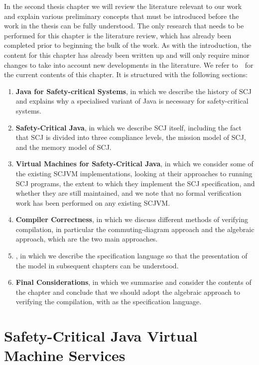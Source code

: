 \documentclass[a4paper,10pt]{report}
\let\olditem\item
\renewcommand{\item}[1][]{\olditem{\bfseries #1}}
\begin{document}
In the second thesis chapter we will review the literature relevant to
our work and explain various preliminary concepts that must be
introduced before the work in the thesis can be fully understood.
The only research that needs to be performed for this chapter is the
literature review, which has already been completed prior to beginning
the bulk of the work.
As with the introduction, the content for this chapter has already
been written up and will only require minor changes to take into
account new developments in the literature.
We refer to~\cite{baxter2016}~for the current contents of this
chapter.
It is structured with the following sections:
\begin{enumerate}
\item[Java for Safety-critical Systems], in which we describe the
  history of SCJ and explains why a specialised variant of Java is
  necessary for safety-critical systems.
\item[Safety-Critical Java], in which we describe SCJ itself, including the
  fact that SCJ is divided into three compliance levels, the mission
  model of SCJ, and the memory model of SCJ.
\item[Virtual Machines for Safety-Critical Java], in which we consider
  some of the existing SCJVM implementations, looking at their
  approaches to running SCJ programs, the extent to which they
  implement the SCJ specification, and whether they are still
  maintained, and we note that no formal verification work has
  been performed on any existing SCJVM.
\item[Compiler Correctness], in which we discuss different methods of
  verifying compilation, in particular the commuting-diagram approach
  and the algebraic approach, which are the two main approaches.
\item[\Circus{}], in which we describe the \Circus{} specification
  language so that the presentation of the model in subsequent
  chapters can be understood.
\item[Final Considerations], in which we summarise and consider the
  contents of the chapter and conclude that we should adopt the
  algebraic approach to verifying the compilation, with \Circus{} as
  the specification language.
\end{enumerate}

\section{Safety-Critical Java Virtual Machine Services}
\end{document}
